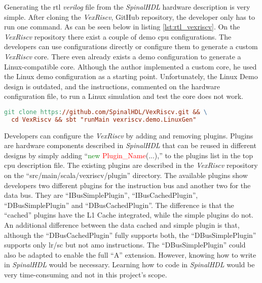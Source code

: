 Generating the \acrshort{rtl} \textit{verilog} file from the \textit{SpinalHDL} hardware description is very simple. After cloning the \textit{VexRiscv}, GitHub repository, the developer only has to run one command. As can be seen below in listing \ref{lst:rtl_vexriscv}. On the \textit{VexRiscv} repository there exist a couple of demo \acrshort{cpu} configurations. The developers can use configurations directly or configure them to generate a custom \textit{VexRiscv} core. There even already exists a demo configuration to generate a Linux-compatible core. Although the author implemented a custom core, he used the Linux demo configuration as a starting point. Unfortunately, the Linux Demo design is outdated, and the instructions, commented on the hardware configuration file, to run a Linux simulation and test the core does not work.

\begin{lstlisting}[language=make, caption={Generate \textit{verilog} from \textit{SpinalHDL}}, label=lst:rtl_vexriscv]
git clone https://github.com/SpinalHDL/VexRiscv.git && \
  cd VexRiscv && sbt "runMain vexriscv.demo.LinuxGen"
\end{lstlisting}

Developers can configure the \textit{VexRiscv} by adding and removing plugins. Plugins are hardware components described in \textit{SpinalHDL} that can be reused in different designs by simply adding \enquote{\textcolor{green}{new} \textcolor{red}{Plugin\_Name}(...),} to the plugins list in the top \acrshort{cpu} description file. The existing plugins are described in the \textit{VexRiscv} repository on the \enquote{src/main/scala/vexriscv/plugin} directory. The available plugins show developers two different plugins for the instruction bus and another two for the data bus. They are \enquote{IBusSimplePlugin}, \enquote{IBusCachedPlugin}, \enquote{DBusSimplePlugin} and \enquote{DBusCachedPlugin}. The difference is that the \enquote{cached} plugins have the L1 Cache integrated, while the simple plugins do not. An additional difference between the data cached and simple plugin is that, although the \enquote{DBusCachedPlugin} fully supports both, the \enquote{DBusSimplePlugin} supports only \acrfull{lr}/\acrfull{sc} but not \acrfull{amo} instructions. The \enquote{DBusSimplePlugin} could also be adapted to enable the full \enquote{A} extension. However, knowing how to write in \textit{SpinalHDL} would be necessary. Learning how to code in \textit{SpinalHDL} would be very time-consuming and not in this project's scope.

